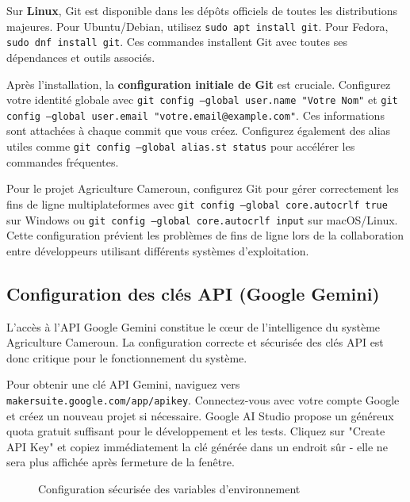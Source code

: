 Sur \textbf{Linux}, Git est disponible dans les dépôts officiels de toutes les distributions majeures. Pour Ubuntu/Debian, utilisez \texttt{sudo apt install git}. Pour Fedora, \texttt{sudo dnf install git}. Ces commandes installent Git avec toutes ses dépendances et outils associés.

Après l'installation, la \textbf{configuration initiale de Git} est cruciale. Configurez votre identité globale avec \texttt{git config --global user.name "Votre Nom"} et \texttt{git config --global user.email "votre.email@example.com"}. Ces informations sont attachées à chaque commit que vous créez. Configurez également des alias utiles comme \texttt{git config --global alias.st status} pour accélérer les commandes fréquentes.

Pour le projet Agriculture Cameroun, configurez Git pour gérer correctement les fins de ligne multiplateformes avec \texttt{git config --global core.autocrlf true} sur Windows ou \texttt{git config --global core.autocrlf input} sur macOS/Linux. Cette configuration prévient les problèmes de fins de ligne lors de la collaboration entre développeurs utilisant différents systèmes d'exploitation.

\subsection{Configuration des clés API (Google Gemini)}

L'accès à l'API Google Gemini constitue le cœur de l'intelligence du système Agriculture Cameroun. La configuration correcte et sécurisée des clés API est donc critique pour le fonctionnement du système.

Pour obtenir une clé API Gemini, naviguez vers \texttt{makersuite.google.com/app/apikey}. Connectez-vous avec votre compte Google et créez un nouveau projet si nécessaire. Google AI Studio propose un généreux quota gratuit suffisant pour le développement et les tests. Cliquez sur "Create API Key" et copiez immédiatement la clé générée dans un endroit sûr - elle ne sera plus affichée après fermeture de la fenêtre.

\begin{figure}[H]
\centering
{}
\caption{Configuration sécurisée des variables d'environnement}
\end{figure}

